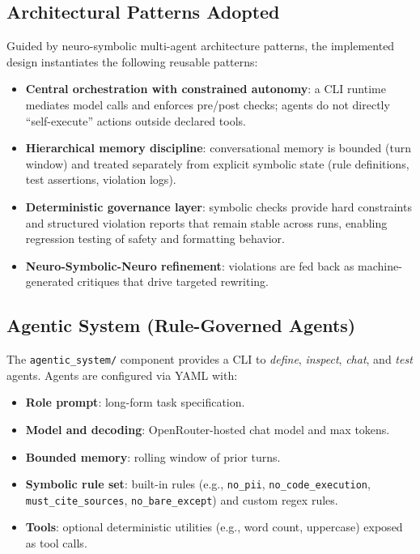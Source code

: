 \documentclass[conference]{IEEEtran}
\begin{document}
\subsection{Architectural Patterns Adopted}
Guided by neuro-symbolic multi-agent architecture patterns, the implemented design instantiates the following reusable patterns:
\begin{itemize}
  \item \textbf{Central orchestration with constrained autonomy}: a CLI runtime mediates model calls and enforces pre/post checks; agents do not directly ``self-execute'' actions outside declared tools.
  \item \textbf{Hierarchical memory discipline}: conversational memory is bounded (turn window) and treated separately from explicit symbolic state (rule definitions, test assertions, violation logs).
  \item \textbf{Deterministic governance layer}: symbolic checks provide hard constraints and structured violation reports that remain stable across runs, enabling regression testing of safety and formatting behavior.
  \item \textbf{Neuro-Symbolic-Neuro refinement}: violations are fed back as machine-generated critiques that drive targeted rewriting.
\end{itemize}

\subsection{Agentic System (Rule-Governed Agents)}
The \texttt{agentic\_system/} component provides a CLI to \emph{define}, \emph{inspect}, \emph{chat}, and \emph{test} agents. Agents are configured via YAML with:
\begin{itemize}
  \item \textbf{Role prompt}: long-form task specification.
  \item \textbf{Model and decoding}: OpenRouter-hosted chat model and max tokens.
  \item \textbf{Bounded memory}: rolling window of prior turns.
  \item \textbf{Symbolic rule set}: built-in rules (e.g., \texttt{no\_pii}, \texttt{no\_code\_execution}, \texttt{must\_cite\_sources}, \texttt{no\_bare\_except}) and custom regex rules.
  \item \textbf{Tools}: optional deterministic utilities (e.g., word count, uppercase) exposed as tool calls.
\end{itemize}
\end{document}
